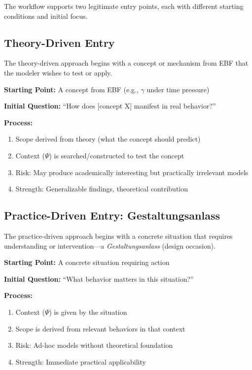 The workflow supports two legitimate entry points, each with different starting
conditions and initial focus.

\subsection{Theory-Driven Entry}

The theory-driven approach begins with a concept or mechanism from EBF that
the modeler wishes to test or apply.

\begin{tcolorbox}[colback=gray!5!white, colframe=gray!75!black,
    title=Theory-Driven Entry]
\textbf{Starting Point:} A concept from EBF (e.g., $\gamma$ under time pressure)

\textbf{Initial Question:} ``How does [concept X] manifest in real behavior?''

\textbf{Process:}
\begin{enumerate}[nosep]
\item Scope derived from theory (what the concept should predict)
\item Context ($\Psi$) is searched/constructed to test the concept
\item Risk: May produce academically interesting but practically irrelevant models
\item Strength: Generalizable findings, theoretical contribution
\end{enumerate}
\end{tcolorbox}

\subsection{Practice-Driven Entry: Gestaltungsanlass}

The practice-driven approach begins with a concrete situation that requires
understanding or intervention---a \textit{Gestaltungsanlass} (design occasion).

\begin{tcolorbox}[colback=gray!5!white, colframe=gray!75!black,
    title=Practice-Driven Entry: Gestaltungsanlass]
\textbf{Starting Point:} A concrete situation requiring action

\textbf{Initial Question:} ``What behavior matters in this situation?''

\textbf{Process:}
\begin{enumerate}[nosep]
\item Context ($\Psi$) is given by the situation
\item Scope is derived from relevant behaviors in that context
\item Risk: Ad-hoc models without theoretical foundation
\item Strength: Immediate practical applicability
\end{enumerate}
\end{tcolorbox}

